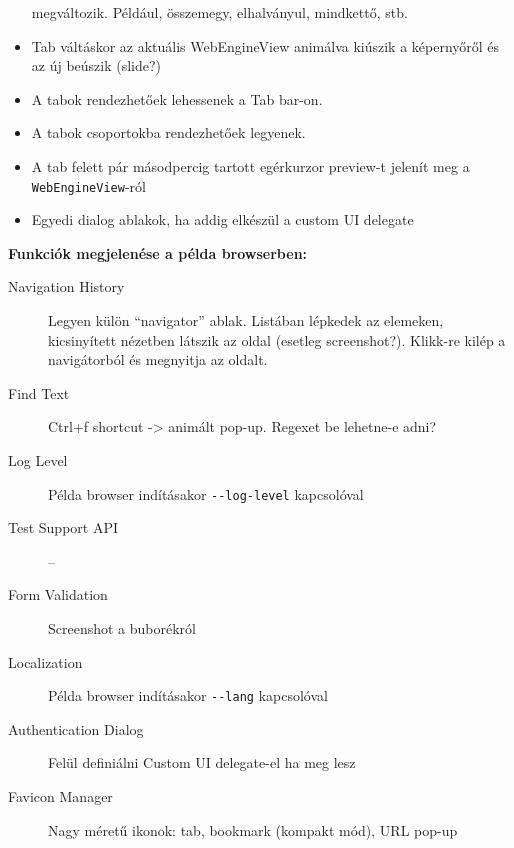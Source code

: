 \documentclass[12pt]{report}
\begin{document}
\begin{itemize}
        megváltozik. Például, összemegy, elhalványul, mindkettő, stb.
    \item Tab váltáskor az aktuális WebEngineView animálva kiúszik a képernyőről és az
        új beúszik (slide?)
    \item A tabok rendezhetőek lehessenek a Tab bar-on.
    \item A tabok csoportokba rendezhetőek legyenek.
    \item A tab felett pár másodpercig tartott egérkurzor preview-t jelenít meg a \\
        \texttt{WebEngineView}-ról
    \item Egyedi dialog ablakok, ha addig elkészül a custom UI delegate
\end{itemize}

\noindent
\textbf{Funkciók megjelenése a példa browserben:}
\begin{description}
    \item[Navigation History] Legyen külön ``navigator'' ablak. Listában lépkedek az
        elemeken, kicsinyített nézetben látszik az oldal (esetleg screenshot?). Klikk-re
        kilép a navigátorból és megnyitja az oldalt.
    \item[Find Text] Ctrl+f shortcut -> animált pop-up. Regexet be lehetne-e adni?
    \item[Log Level] Példa browser indításakor \texttt{-{}-log-level} kapcsolóval
    \item[Test Support API] --
    \item[Form Validation] Screenshot a buborékról
    \item[Localization] Példa browser indításakor \texttt{-{}-lang} kapcsolóval
    \item[Authentication Dialog] Felül definiálni Custom UI delegate-el ha meg lesz
    \item[Favicon Manager] Nagy méretű ikonok: tab, bookmark (kompakt mód), URL pop-up
\end{description}

\end{document}
